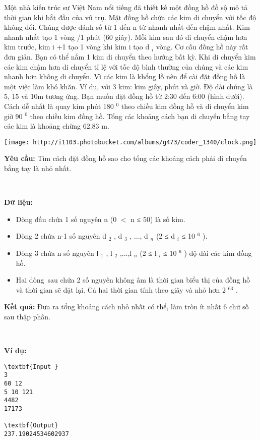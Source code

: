 

Một nhà kiến trúc sư Việt Nam nổi tiếng đã thiết kế một đồng hồ đồ sộ mô tả thời gian khi bắt đầu của vũ trụ. Mặt đồng hồ chứa các kim di chuyển với tốc độ không đổi. Chúng được đánh số từ 1 đến n từ nhanh nhất đến chậm nhất. Kim nhanh nhất tạo 1 vòng /1 phút (60 giây). Mỗi kim sau đó di chuyển chậm hơn kim trước, kim i +1 tạo 1 vòng khi kim i tạo d $_ i $ vòng. Cơ cấu đồng hồ này rất đơn giản. Bạn có thể nắm 1 kim di chuyển theo hướng bất kỳ. Khi di chuyển kim các kim chậm hơn di chuyển tỉ lệ với tốc độ bình thường của chúng và các kim nhanh hơn không di chuyển. Vì các kim là khổng lồ nên để cài đặt đồng hồ là một việc làm khó khăn. Ví dụ, với 3 kim: kim giây, phút và giờ. Độ dài chúng là 5, 15 và 10m tương ứng. Bạn muốn đặt đồng hồ từ 2:30 đến 6:00 (hình dưới). Cách dễ nhất là quay kim phút 180 $^ 0 $ theo chiều kim đồng hồ và di chuyển kim giờ 90 $^ 0 $ theo chiều kim đồng hồ. Tổng các khoảng cách bạn di chuyển bằng tay các kim là khoảng chừng 62.83 m.


\texttt{[image: http://i1103.photobucket.com/albums/g473/coder\_1340/clock.png]}

\textbf{Yêu cầu: } Tìm cách đặt đồng hồ sao cho tổng các khoảng cách phải di chuyển bằng tay là nhỏ nhất.

 

\textbf{Dữ liệu: }
\begin{itemize}
	\item Dòng đầu chứa 1 số nguyên n (0 $<$ n ≤ 50) là số kim.
	\item Dòng 2 chứa n-1 số nguyên d $_ 2 $ , d $_ 3 $ , ..., d $_ n $ (2 ≤ d $_ i $ ≤ 10 $^ 6 $ ).
	\item Dòng 3 chứa n số nguyên l $_ 1 $ , l $_ 2 $ ,...,l $_ n $ (2 ≤ l $_ i $ ≤ 10 $^ 6 $ ) độ dài các kim đồng hồ.
	\item Hai dòng sau chứa 2 số nguyên không âm là thời gian biểu thị của đồng hồ và thời gian sẽ đặt lại. Cả hai thời gian tính theo giây và nhỏ hơn 2 $^ 63 $ .
\end{itemize}

\textbf{Kết quả: } Đưa ra tổng khoảng cách nhỏ nhất có thể, làm tròn ít nhất 6 chữ số sau thập phân.

 

\textbf{Ví dụ: }
\begin{verbatim}
\textbf{Input }
3
60 12
5 10 121
4482
17173

\textbf{Output}
237.19024534602937\end{verbatim}